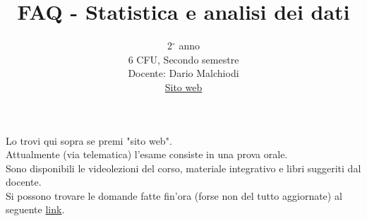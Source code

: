 \documentclass{article}
\title{FAQ - \textbf{Statistica e analisi dei dati}}
\author{
	2$^{\circ}$ anno\\6 CFU, Secondo semestre\\
	Docente: Dario Malchiodi\\ 
	\href{https://malchiodi.di.unimi.it/teaching/SAD/}{Sito web}
	\date{}
}
\begin{document}
 
	\maketitle
	
	\begin{enumerate}
		
		\rmfamily
		Lo trovi qui sopra se premi "sito web".\\
		
		Attualmente (via telematica) l'esame consiste in una prova orale.\\
		
		Sono disponibili le videolezioni del corso, materiale integrativo e libri suggeriti dal docente.\\
		
		Si possono trovare le domande fatte fin'ora (forse non del tutto aggiornate) al seguente
		\href{https://colab.research.google.com/drive/1ASYHnmJWRo47sAbcHxhjAZErZjOZaKYP?usp=sharing}{link}.\\
		
	\end{enumerate}
	
\end{document}
